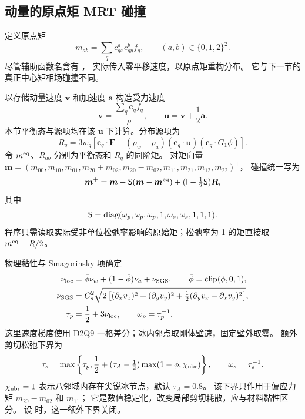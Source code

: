 \subsection{动量的原点矩 MRT 碰撞}
\label{sec:collision}
定义原点矩
\begin{equation}
 m_{ab}=\sum_qc_{qx}^{a}c_{qy}^{b}f_q,
 \qquad (a,b)\in\{0,1,2\}^2.
\end{equation}
尽管辅助函数名含有 ，
 实际传入零平移速度，以原点矩重构分布。
它与下一节的真正中心矩相场碰撞不同。

以存储动量速度 $\bm v$ 和加速度 $\bm a$ 构造受力速度
\begin{equation}
 \bm v=\frac{\sum_q\bm c_q f_q}{\rho},\qquad
 \bm u=\bm v+\frac12\bm a.
 \label{eq:physical-u}
\end{equation}
本节平衡态与源项均在该 $\bm u$ 下计算。分布源项为
\begin{equation}
 R_q=3w_q\left[\bm c_q\cdot\bm F+
 (\rho_w-\rho_a)(\bm c_q\cdot\bm u)(\bm c_q\cdot G_1\phi)\right].
 \label{eq:momentum-source}
\end{equation}
令 $m^{\rm eq}$、$R_{ab}$ 分别为平衡态和 $R_q$ 的同阶矩。
对矩向量
$\bm m=(m_{00},m_{10},m_{01},m_{20}+m_{02},m_{20}-m_{02},m_{11},m_{21},m_{12},m_{22})^{\mathsf T}$，
碰撞统一写为
\begin{equation}
 \bm m^+=\bm m-\mathsf S(\bm m-\bm m^{\rm eq})+
 (\mathsf I-\tfrac12\mathsf S)\bm R,
 \label{eq:mrt}
\end{equation}
其中
\begin{equation}
 \mathsf S=\operatorname{diag}(\omega_p,\omega_p,\omega_p,1,\omega_s,\omega_s,1,1,1).
\end{equation}
程序只需读取实际受非单位松弛率影响的原始矩；松弛率为 1 的矩直接取
$m^{\rm eq}+R/2$。

物理黏性与 Smagorinsky 项确定
\begin{align}
 \nu_{\rm loc}&=\bar\phi\nu_w+(1-\bar\phi)\nu_a+\nu_{\rm SGS},\qquad
 \bar\phi=\operatorname{clip}(\phi,0,1),\\
 \nu_{\rm SGS}&=C_s^2\sqrt{2\left[(\partial_xv_x)^2+(\partial_yv_y)^2+
 \tfrac12(\partial_yv_x+\partial_xv_y)^2\right]},\\
 \tau_p&=\frac12+3\nu_{\rm loc},\qquad\omega_p=\tau_p^{-1}.
\end{align}
这里速度梯度使用 D2Q9 一格差分；冰内邻点取刚体壁速，固定壁外取零。
额外剪切松弛下界为
\begin{equation}
 \tau_s=\max\left\{\tau_p,\frac12+(\tau_A-\tfrac12)
 \max(1-\bar\phi,\chi_{\rm nbr})\right\},\qquad \omega_s=\tau_s^{-1}.
\end{equation}
$\chi_{\rm nbr}=1$ 表示八邻域内存在尖锐冰节点，默认 $\tau_A=0.8$。
该下界只作用于偏应力矩 $m_{20}-m_{02}$ 和 $m_{11}$；
它是数值稳定化，改变局部剪切耗散，应与材料黏性区分。
设  时，这一额外下界关闭。

